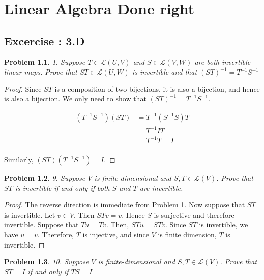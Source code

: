 \documentclass[12pt]{book}
\newtheorem*{problem*}{Problem}
\newcommand{\LL}{\mathcal{L}}
\begin{document}
%

\chapter{Linear Algebra Done right}

\section{Excercise : 3.D}

\begin{problem*}
  1. Suppose $T \in \LL(U,V)$ and $ S \in \LL(V,W)$ are both invertible
  linear maps. Prove that $ST \in \LL(U,W)$ is invertible and that $(ST)^{-1} = T^{-1}S^{-1}$
\end{problem*}

\begin{proof}
  Since $ST$ is a composition of two bijections, it is also a bijection, and hence is also a bijection. We only need to show that $(ST)^{-1} = T^{-1}S^{-1}$.

  \begin{align*}
    (T^{-1} S^{-1}) (S T) & = T^{-1} (S^{-1} S) T\\
    & = T^{-1} I T\\
    & = T^{-1}T = I \\
  \end{align*}

  Similarly, $(S T) (T^{-1} S^{-1}) = I$.
\end{proof}

\begin{problem*}9. Suppose $V$ is finite-dimensional and $S,T \in \LL(V)$. Prove that $ST$ is invertible if and only if both $S$ and $T$ are invertible.\end{problem*}

\begin{proof}
  The reverse direction is immediate from Problem 1. Now suppose that $ST$ is invertible. Let $v \in V$. Then $STv = v$. Hence $S$ is surjective and therefore invertible. Suppose that $Tu = Tv$. Then, $ST u = ST v$. Since $ST$ is invertible, we have $u = v$. Therefore, $T$ is injective, and since $V$ is finite dimension, $T$ is invertible. 
\end{proof}

\begin{problem*}10. Suppose $V$ is finite-dimensional and $S, T \in \LL(V)$. Prove that $ST = I$ if and only if $TS = I$\end{problem*}
\end{document}
